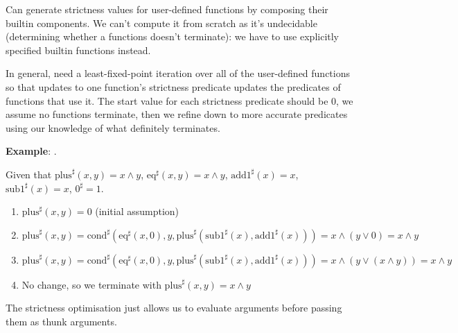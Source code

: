 \documentclass[a4paper, 11pt]{article}
\begin{document}
{    Can generate strictness values for user-defined functions by composing their builtin components. We can't compute it from scratch as it's undecidable (determining whether a functions doesn't terminate): we have to use explicitly specified builtin functions instead.

    In general, need a least-fixed-point iteration over all of the user-defined functions so that updates to one function's strictness predicate updates the predicates of functions that use it. The start value for each strictness predicate should be 0, we assume no functions terminate, then we refine down to more accurate predicates using our knowledge of what definitely terminates.

    \textbf{Example}: .

    Given that \(\text{plus}^\sharp(x,y) = x \wedge y\), \(\text{eq}^\sharp(x,y) = x \wedge y\), \(\text{add1}^\sharp(x) = x\), \(\text{sub1}^\sharp(x) = x\), \(0^\sharp = 1\).
    \begin{enumerate}
    \item \(\text{plus}^\sharp(x, y) = 0\) (initial assumption)
    \item \(\text{plus}^\sharp(x, y) = \text{cond}^\sharp(\text{eq}^\sharp(x,0), y, \text{plus}^\sharp(\text{sub1}^\sharp(x), \text{add1}^\sharp(x))) = x \wedge (y \vee 0) = x \wedge y\)
    \item \(\text{plus}^\sharp(x, y) = \text{cond}^\sharp(\text{eq}^\sharp(x,0), y, \text{plus}^\sharp(\text{sub1}^\sharp(x), \text{add1}^\sharp(x))) = x \wedge (y \vee (x \wedge y)) = x \wedge y\)
    \item No change, so we terminate with \(\text{plus}^\sharp(x,y) = x \wedge y\)
    \end{enumerate}

    The strictness optimisation just allows us to evaluate arguments before passing them as thunk arguments.
}
\end{document}
